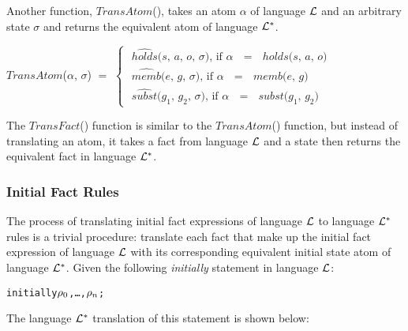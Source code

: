 \documentclass[11pt]{report}
\newenvironment{vverbatim}
{
  \begin{alltt}
}
{
    \vspace{-\baselineskip}
  \end{alltt}
}
\newenvironment{vquote}
{
  \begin{list}{}{\leftmargin 1em}\item[]
}
{
  \end{list}
}
\begin{document}
        Another function, $TransAtom$(), takes an atom $\alpha$ of language
        ${\cal L}$ and an arbitrary state $\sigma$ and returns the equivalent
        atom of language ${\cal L}^{*}$.

        \begin{vquote}
          $TransAtom$($\alpha$, $\sigma$)
          $=$
          \begin{math}
            \begin{cases}
              \mbox{
                $\hat{holds}$($s$, $a$, $o$, $\sigma$),
                  if $\alpha$ $=$ $holds$($s$, $a$, $o$)
              } \\
              \mbox{
                $\hat{memb}$($e$, $g$, $\sigma$),
                  if $\alpha$ $=$ $memb$($e$, $g$)
              } \\
              \mbox{
                $\hat{subst}$($g_{1}$, $g_{2}$, $\sigma$),
                  if $\alpha$ $=$ $subst$($g_{1}$, $g_{2}$)
              }
            \end{cases}
          \end{math}
        \end{vquote}

        The $TransFact$() function is similar to the $TransAtom$()
        function, but instead of translating an atom, it takes a fact
        from language ${\cal L}$ and a state then returns the equivalent
        fact in language ${\cal L}^{*}$.

        \subsubsection{Initial Fact Rules}

          The process of translating initial fact expressions of language
          ${\cal L}$ to language ${\cal L}^{*}$ rules is a trivial procedure:
          translate each fact that make up the initial fact expression of
          language ${\cal L}$ with its corresponding equivalent initial state
          atom of language ${\cal L}^{*}$. Given the following
          {\em initially} statement in language ${\cal L}$:

          \begin{vverbatim}
  initially \(\rho\sb{0}\), \ldots, \(\rho\sb{n}\);
          \end{vverbatim}

          \noindent
          The language ${\cal L}^{*}$ translation of this statement is shown
          below:
\end{document}
